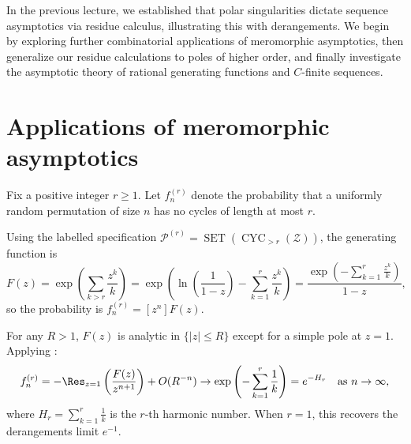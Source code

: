 
In the previous lecture, we established that polar singularities dictate sequence asymptotics via residue calculus, illustrating this with derangements.
We begin by exploring further combinatorial applications of meromorphic asymptotics, then generalize our residue calculations to poles of higher order, and finally investigate the asymptotic theory of rational generating functions and \(C\)-finite sequences.

\section*{Applications of meromorphic asymptotics}

\begin{example}
    \label{ex:no-short-cycles}
    Fix a positive integer \(r \ge 1\).
    Let \(f_n^{(r)}\) denote the probability that a uniformly random permutation of size \(n\) has no cycles of length at most \(r\).

    Using the labelled specification \(\mathcal{P}^{(r)} = \operatorname{SET}(\operatorname{CYC}_{> r}(\mathcal{Z}))\), the generating function is
    \[
        F(z) = \exp\left( \sum_{k > r} \frac{z^k}{k} \right) = \exp\left( \ln\left( \frac{1}{1-z} \right) - \sum_{k=1}^r \frac{z^k}{k} \right) = \frac{\exp\left( -\sum_{k=1}^r \frac{z^k}{k} \right)}{1-z},
    \]
    so the probability is \(f_n^{(r)} = [z^n] F(z)\).

    For any \(R > 1\), \(F(z)\) is analytic in \(\{|z| \le R\}\) except for a simple pole at \(z = 1\).
    Applying :
    \[
        f_n^{(r)} = - \Res_{z=1} \left( \frac{F(z)}{z^{n+1}} \right) + O(R^{-n}) \to \exp\left( -\sum_{k=1}^r \frac{1}{k} \right) = e^{-H_r} \quad \text{as } n \to \infty,
    \]
    where \(H_r = \sum_{k=1}^r \frac{1}{k}\) is the \(r\)-th harmonic number.
    When \(r = 1\), this recovers the derangements limit \(e^{-1}\).
\end{example}

